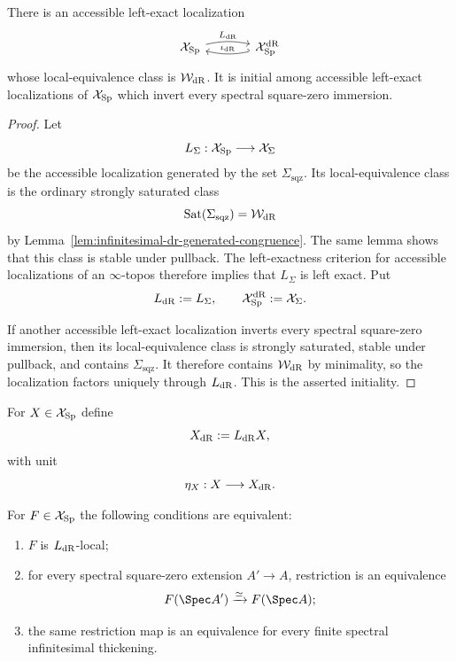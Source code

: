 \begin{theorem}
\label{thm:infinitesimal-dr-localization}
There is an accessible left-exact localization
\[
\begin{tikzcd}[column sep=large]
    \mathcal X_{\Sp}
        \ar[r,"L_{\dR}",bend left=12]
    &
    \mathcal X_{\Sp}^{\dR}
        \ar[l,hook',"\iota_{\dR}"',bend left=12]
\end{tikzcd}
\]
whose local-equivalence class is $\mathcal W_{\mathrm{dR}}$.  It is initial among
accessible left-exact localizations of $\mathcal X_{\mathrm{Sp}}$ which invert every
spectral square-zero immersion.
\end{theorem}

\begin{proof}
Let
\[
    L_\Sigma:
    \mathcal X_{\mathrm{Sp}}\longrightarrow\mathcal X_\Sigma
\]
be the accessible localization generated by the set
$\Sigma_{\mathrm{sqz}}$.  Its local-equivalence class is the ordinary
strongly saturated class
\[
    \operatorname{Sat}(\Sigma_{\mathrm{sqz}})
    =
    \mathcal W_{\mathrm{dR}}
\]
by Lemma~\ref{lem:infinitesimal-dr-generated-congruence}.  The same lemma
shows that this class is stable under pullback.  The left-exactness criterion
for accessible localizations of an $\infty$-topos therefore implies that
$L_\Sigma$ is left exact.  Put
\[
    L_{\mathrm{dR}}:=L_\Sigma,
    \qquad
    \mathcal X_{\mathrm{Sp}}^{\mathrm{dR}}:=\mathcal X_\Sigma.
\]

If another accessible left-exact localization inverts every spectral
square-zero immersion, then its local-equivalence class is strongly saturated,
stable under pullback, and contains $\Sigma_{\mathrm{sqz}}$.  It therefore
contains $\mathcal W_{\mathrm{dR}}$ by minimality, so the localization factors
uniquely through $L_{\mathrm{dR}}$.  This is the asserted initiality.
\end{proof}

\begin{definition}
\label{def:infinitesimal-absolute-dr-object}
For $X\in\mathcal X_{\mathrm{Sp}}$ define
\[
    X_{\mathrm{dR}}:=L_{\mathrm{dR}}X,
\]
with unit
\[
    \eta_X:X\longrightarrow X_{\mathrm{dR}}.
\]
\end{definition}

\begin{theorem}
\label{thm:infinitesimal-dr-locality}
For $F\in\mathcal X_{\mathrm{Sp}}$ the following conditions are equivalent:
\begin{enumerate}
\item $F$ is $L_{\mathrm{dR}}$-local;
\item for every spectral square-zero extension $A'\to A$, restriction is an
equivalence
\[
    F(\Spec A')\xrightarrow{\simeq}F(\Spec A);
\]
\item the same restriction map is an equivalence for every finite spectral
infinitesimal thickening.
\end{enumerate}
\end{theorem}

